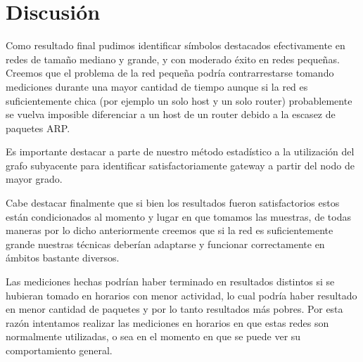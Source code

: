 \section{Discusión}

Como resultado final pudimos identificar símbolos destacados efectivamente en redes de tamaño mediano y grande, y con moderado éxito en redes pequeñas. Creemos que el problema de la red pequeña podría contrarrestarse tomando mediciones durante una mayor cantidad de tiempo aunque si la red es suficientemente chica (por ejemplo un solo host y un solo router) probablemente se vuelva imposible diferenciar a un host de un router debido a la escasez de paquetes ARP.

Es importante destacar a parte de nuestro método estadístico a la utilización del grafo subyacente para identificar satisfactoriamente gateway a partir del nodo de mayor grado.

Cabe destacar finalmente que si bien los resultados fueron satisfactorios estos están condicionados al momento y lugar en que tomamos las muestras, de todas maneras por lo dicho anteriormente creemos que si la red es suficientemente grande nuestras técnicas deberían adaptarse y funcionar correctamente en ámbitos bastante diversos.

Las mediciones hechas podrían haber terminado en resultados distintos si se hubieran tomado en horarios con menor actividad, lo cual podría haber resultado en menor cantidad de paquetes y por lo tanto resultados más pobres. Por esta razón intentamos realizar las mediciones en horarios en que estas redes son normalmente utilizadas, o sea en el momento en que se puede ver su comportamiento general.
